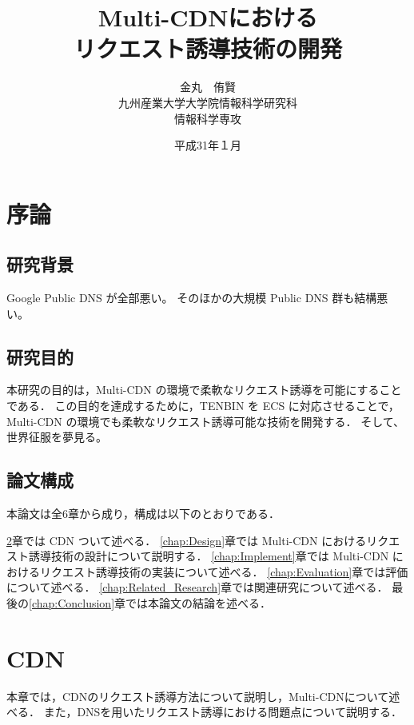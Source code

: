 \documentclass[a4j,12pt,onecolumn,oneside,titlepage,openany,final]{jreport}
\title{
 \Huge{Multi-CDNにおける}\\
 \Huge{リクエスト誘導技術の開発}
 \vspace{5.5cm}\\
}
\author{\LARGE{金丸　侑賢}\vspace{2cm}\\
\LARGE{九州産業大学大学院情報科学研究科}\vspace{0.5cm}\\
\LARGE{情報科学専攻}\vspace{1cm}\\
}
\date{\LARGE{平成31年１月}}
\begin{document}
\maketitle
\tableofcontents
\listoffigures
\listoftables

\chapter{序論}\label{chap:Prologue}

\section{研究背景}
Google Public DNS が全部悪い。
そのほかの大規模 Public DNS 群も結構悪い。
 
\section{研究目的}
本研究の目的は，Multi-CDN の環境で柔軟なリクエスト誘導を可能にすることである．
この目的を達成するために，TENBIN を ECS に対応させることで，Multi-CDN の環境でも柔軟なリクエスト誘導可能な技術を開発する．
そして、世界征服を夢見る。

\section{論文構成}
 本論文は全6章から成り，構成は以下のとおりである．
   
 \ref{chap:CDN}章では CDN ついて述べる．
 \ref{chap:Design}章では Multi-CDN におけるリクエスト誘導技術の設計について説明する．
 \ref{chap:Implement}章では Multi-CDN におけるリクエスト誘導技術の実装について述べる．
 \ref{chap:Evaluation}章では評価について述べる．
 \ref{chap:Related_Research}章では関連研究について述べる．
 最後の\ref{chap:Conclusion}章では本論文の結論を述べる．


\chapter{CDN}\label{chap:CDN}
本章では，CDNのリクエスト誘導方法について説明し，Multi-CDNについて述べる．
また，DNSを用いたリクエスト誘導における問題点について説明する．
\end{document}
